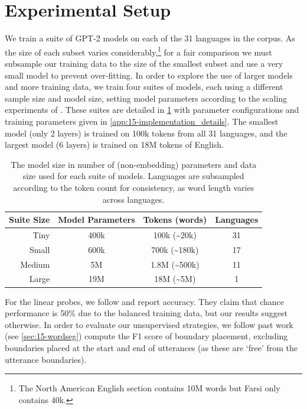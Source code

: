 \section{Experimental Setup}

We train a suite of GPT-2 models on each of the 31 languages in the \ipachildes corpus. As the size of each subset varies considerably,\footnote{The North American English section contains 10M words but Farsi only contains 40k.} for a fair comparison we must subsample our training data to the size of the smallest subset and use a very small model to prevent over-fitting. In order to explore the use of larger models and more training data, we train four suites of models, each using a different sample size and model size, setting model parameters according to the scaling experiments of \citet{goriely2025}. These suites are detailed in \cref{tab:15-suites} with parameter configurations and training parameters given in \cref{app:15-implementation_details}. The smallest model (only 2 layers) is trained on 100k tokens from all 31 languages, and the largest model (6 layers) is trained on 18M tokens of English. 

\setlength{\tabcolsep}{2pt}
\begin{table}[t]
    \centering
    \small
    \begin{tabular}{rccc}
    \toprule
        Suite Size & Model Parameters & Tokens (words) & Languages \\
       \midrule
       Tiny & 400k & 100k (\textasciitilde20k) & 31 \\
       Small & 600k & 700k (\textasciitilde180k) & 17 \\
       Medium & 5M & 1.8M (\textasciitilde500k) & 11 \\
       Large & 19M & 18M (\textasciitilde5M) & 1 \\
       \bottomrule
    \end{tabular}
    \caption{The model size in number of (non-embedding) parameters and data size used for each suite of models. Languages are subsampled according to the token count for consistency, as word length varies across languages.}
    \label{tab:15-suites}
\end{table}

For the linear probes, we follow \citet{hahn-baroni-2019-tabula} and report accuracy. They claim that chance performance is 50\% due to the balanced training data, but our results suggest otherwise. In order to evaluate our unsupervised strategies, we follow past work (see \cref{sec:15-wordseg}) compute the F1 score of boundary placement, excluding boundaries placed at the start and end of utterances (as these are `free' from the utterance boundaries).

